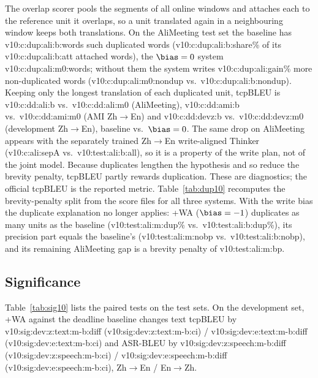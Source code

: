 The overlap scorer pools the segments of all online windows and attaches each to the reference unit it overlaps, so a
unit translated again in a neighbouring window keeps both translations. On the AliMeeting test set the baseline has
\num{v10:c:dup:ali:b:words} such duplicated words (\num{v10:c:dup:ali:b:share}\% of its \num{v10:c:dup:ali:b:att}
attached words), the $\bias=0$ system \num{v10:c:dup:ali:m0:words}; without them the system writes
\num{v10:c:dup:ali:gain}\% more non-duplicated words (\num{v10:c:dup:ali:m0:nondup} vs.\ \num{v10:c:dup:ali:b:nondup}). Keeping
only the longest translation of each duplicated unit, tcpBLEU is \num{v10:c:dd:ali:b} vs.\ \num{v10:c:dd:ali:m0}
(AliMeeting), \num{v10:c:dd:ami:b} vs.\ \num{v10:c:dd:ami:m0} (AMI Zh$\rightarrow$En) and \num{v10:c:dd:devz:b} vs.\
\num{v10:c:dd:devz:m0} (development Zh$\rightarrow$En), baseline vs.\ $\bias=0$. The same drop on AliMeeting appears with
the separately trained Zh$\rightarrow$En write-aligned Thinker (\num{v10:c:ali:sepA} vs.\ \num{v10:test:ali:b:all}), so it
is a property of the write plan, not of the joint model. Because duplicates lengthen the hypothesis and so reduce the brevity
penalty, tcpBLEU partly rewards duplication. These are diagnostics; the official tcpBLEU is the reported
metric. Table~\ref{tab:dup10} recomputes the brevity-penalty split from the score files for all three systems. With
the write bias the duplicate explanation no longer applies: \sys{}+WA ($\bias=-1$) duplicates as many units as the
baseline (\num{v10:test:ali:m:dup}\% vs.\ \num{v10:test:ali:b:dup}\%), its precision part equals the baseline's
(\num{v10:test:ali:m:nobp} vs.\ \num{v10:test:ali:b:nobp}), and its remaining AliMeeting gap is a brevity penalty of
\num{v10:test:ali:m:bp}.



\subsection{Significance}
\label{app:sig10}



Table~\ref{tab:sig10} lists the paired tests on the test sets. On the development set, \sys{}+WA against the deadline
baseline changes text tcpBLEU by \num{v10:sig:dev:z:text:m-b:diff} (\num{v10:sig:dev:z:text:m-b:ci}) /
\num{v10:sig:dev:e:text:m-b:diff} (\num{v10:sig:dev:e:text:m-b:ci}) and ASR-BLEU by
\num{v10:sig:dev:z:speech:m-b:diff} (\num{v10:sig:dev:z:speech:m-b:ci}) / \num{v10:sig:dev:e:speech:m-b:diff}
(\num{v10:sig:dev:e:speech:m-b:ci}), Zh$\rightarrow$En / En$\rightarrow$Zh.

